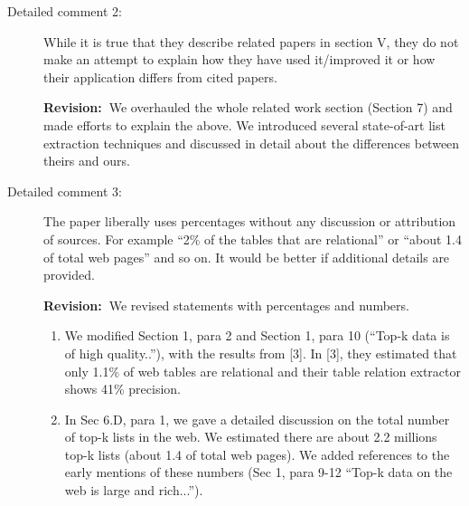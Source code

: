 \documentclass[11pt]{article}
\newcommand{\rv}{\textbf{Revision:~}}
\begin{document}
\begin{description}
\item[Detailed comment 2:] While it is true that they describe related papers in section V, they do
not make an attempt to explain how they have used it/improved it or how
their application differs from cited papers.

\rv We overhauled the whole related work section (Section 7) and made
efforts to explain the above. We introduced several state-of-art
list extraction techniques and discussed in detail about the
differences between theirs and ours.

\item[Detailed comment 3:] The paper liberally uses percentages without any discussion or
attribution of sources. For example ``2\% of the tables that are relational''
or ``about 1.4\textperthousand{} of total web pages'' and so on.
It would be better if additional details are provided.

\rv We revised statements with percentages and numbers.
\begin{enumerate}
\item We modified Section 1, para 2 and Section 1, para 10 (``Top-k data is of high
 quality..''), with the results from [3]. In [3], they estimated that only
 1.1\% of web tables are relational and their table relation
 extractor shows 41\% precision.
\item In Sec 6.D, para 1, we gave a detailed discussion on the total
 number of top-k lists in the web. We estimated there are about 2.2 millions
 top-k lists (about 1.4\textperthousand{} of total web pages).
 We added references to the early mentions of these numbers (Sec 1, para 9-12 ``Top-k data on the
 web is large and rich...'').
\end{enumerate}
\end{description}
\end{document}
